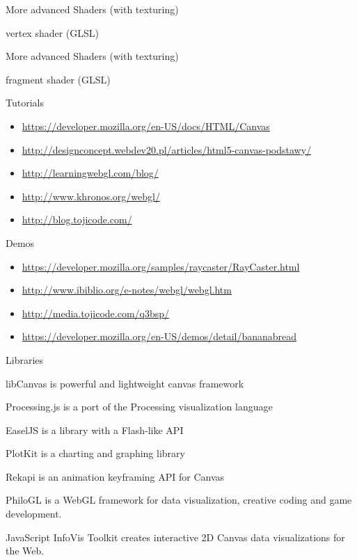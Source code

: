 \documentclass{beamer}
\begin{document}
\begin{frame}{More advanced Shaders (with texturing)}

vertex shader (GLSL)


\end{frame}


\begin{frame}{More advanced Shaders (with texturing)}

fragment shader (GLSL)


\end{frame}

\begin{frame}{Tutorials}
\begin{itemize}
\item \url{https://developer.mozilla.org/en-US/docs/HTML/Canvas}
\item \url{http://designconcept.webdev20.pl/articles/html5-canvas-podstawy/}
\item \url{http://learningwebgl.com/blog/}
\item \url{http://www.khronos.org/webgl/}
\item \url{http://blog.tojicode.com/}
\end{itemize}

\end{frame}

\begin{frame}{Demos}
\begin{itemize}
\item \url{https://developer.mozilla.org/samples/raycaster/RayCaster.html}
\item \url{http://www.ibiblio.org/e-notes/webgl/webgl.htm}
\item \url{http://media.tojicode.com/q3bsp/}
\item \url{https://developer.mozilla.org/en-US/demos/detail/bananabread}
\end{itemize}

\end{frame}

\begin{frame}{Libraries}

libCanvas is powerful and lightweight canvas framework

Processing.js is a port of the Processing visualization language

EaselJS is a library with a Flash-like API

PlotKit is a charting and graphing library

Rekapi is an animation keyframing API for Canvas

PhiloGL is a WebGL framework for data visualization, creative coding and game development.

JavaScript InfoVis Toolkit creates interactive 2D Canvas data visualizations for the Web.


\end{frame}
\end{document}
